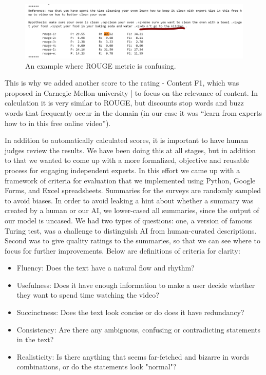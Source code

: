 \documentclass{article}
\begin{document}
\begin{figure}[H]
  \includegraphics[width=\linewidth]{pic1.png}
  \caption{An example where ROUGE metric is confusing.}
  \label{fig:funnysummary}
\end{figure}

This is why we added another score to the rating -  Content F1, which was proposed in Carnegie Mellon university | to focus on the relevance of content. In calculation it is very similar to ROUGE, but discounts stop words and buzz words that frequently occur in the domain (in our case it was “learn from experts how to in this free online video”).  

In addition to automatically calculated scores, it is important to have human judges review the results. We have been doing this at all stages, but in addition to that we wanted to come up with a more formalized, objective and reusable process for engaging independent experts. In this effort we came up with a framework of criteria for evaluation that we implemented using Python, Google Forms, and Excel spreadsheets. Summaries for the surveys are randomly sampled to avoid biases.  In order to avoid leaking a hint about whether a summary was created by a human or our AI, we lower-cased all summaries, since the output of our model is uncased. We had two types of questions: one, a version of famous Turing test, was a challenge to distinguish AI from human-curated descriptions. Second was to give quality ratings to the summaries, so that we can see where to focus for further improvements. Below are definitions of criteria for clarity:
\begin{itemize}

\item Fluency: Does the text have a natural flow and rhythm?
\item Usefulness: Does it have enough information to make a user decide whether they want to spend time watching the video?
\item Succinctness: Does the text look concise or do does it have redundancy?
\item Consistency: Are there any ambiguous, confusing or contradicting statements in the text?
\item Realisticity: Is there anything that seems far-fetched and bizarre in words combinations, or do the statements look "normal"?

\end{itemize}
\end{document}

